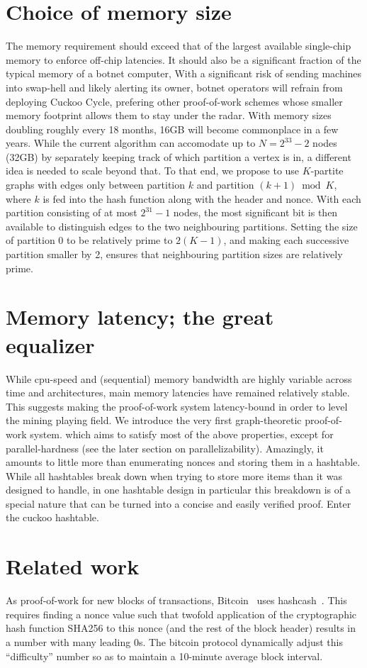 \documentclass[11pt, oneside]{article}
\begin{document}
\section{Choice of memory size}
The memory requirement should exceed that of the largest available
single-chip memory to enforce off-chip latencies. It should also be a
significant fraction of the typical memory of a botnet computer,
With a significant risk of sending machines into swap-hell and
likely alerting its owner, botnet operators will refrain from deploying
Cuckoo Cycle, prefering other proof-of-work schemes whose smaller memory
footprint allows them to stay under the radar.
With memory sizes doubling roughly every 18 months, 16GB will become
commonplace in a few years.
While the current algorithm can accomodate up to $N=2^{33}-2$ nodes
(32GB) by separately keeping track of which partition a vertex is in,
a different idea is needed to scale beyond that.
To that end, we propose to use $K$-partite graphs with edges only between
partition $k$ and partition $(k+1) \bmod K$, where $k$ is fed into the hash
function along with the header and nonce. With each partition consisting of
at most $2^{31}-1$ nodes, the most significant bit is then available to
distinguish edges to the two neighbouring partitions.
Setting the size of partition 0 to be relatively prime to $2(K-1)$,
and making each successive partition smaller by 2,
ensures that neighbouring partition sizes are relatively prime.

\section{Memory latency; the great equalizer}
While cpu-speed and (sequential) memory bandwidth are highly variable across
time and architectures, main memory latencies have remained relatively
stable. This suggests making the proof-of-work system latency-bound in order
to level the mining playing field.
We introduce the very first graph-theoretic proof-of-work system.
which aims to satisfy most of the above properties,
except for parallel-hardness (see the later section on parallelizability).
Amazingly, it amounts to little more than enumerating nonces and storing them
in a hashtable. While all hashtables break down when trying to store more
items than it was designed to handle, in one hashtable design in particular
this breakdown is of a special nature that can be turned into a concise and
easily verified proof. Enter the cuckoo hashtable.

\section{Related work}
As proof-of-work for new blocks of transactions,
Bitcoin~\cite{nakamoto2009bitcoin} uses hashcash~\cite{back2002}.
This requires finding a nonce value such that
twofold application of the cryptographic hash function SHA256
to this nonce (and the rest of the block header) results in a number with
many leading 0s. The bitcoin protocol dynamically adjust this ``difficulty''
number so as to maintain a 10-minute average block interval.
\end{document}
